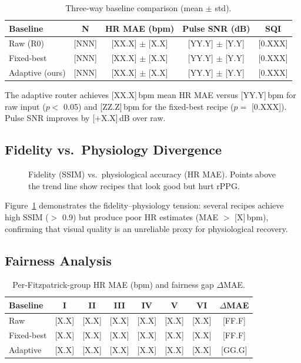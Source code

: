 \documentclass[conference]{IEEEtran}
\begin{document}
\begin{table}[t]
\centering
\caption{Three-way baseline comparison (mean $\pm$ std).}
\label{tab:main_results}
\begin{tabular}{@{}lcccc@{}}
\toprule
Baseline & N & HR MAE (bpm) & Pulse SNR (dB) & SQI \\
\midrule
Raw (R0) & [NNN] & [XX.X] $\pm$ [X.X] & [YY.Y] $\pm$ [Y.Y] & [0.XXX] \\
Fixed-best & [NNN] & [XX.X] $\pm$ [X.X] & [YY.Y] $\pm$ [Y.Y] & [0.XXX] \\
Adaptive (ours) & [NNN] & [XX.X] $\pm$ [X.X] & [YY.Y] $\pm$ [Y.Y] & [0.XXX] \\
\bottomrule
\end{tabular}
\end{table}

The adaptive router achieves [XX.X]\,bpm mean HR MAE versus [YY.Y]\,bpm for raw input ($p <$ 0.05) and [ZZ.Z]\,bpm for the fixed-best recipe ($p =$ [0.XXX]). Pulse SNR improves by [+X.X]\,dB over raw.

\subsection{Fidelity vs.\ Physiology Divergence}
\label{subsec:divergence}

\begin{figure}[t]
\centering
{}
\caption{Fidelity (SSIM) vs.\ physiological accuracy (HR MAE). Points above the trend line show recipes that look good but hurt rPPG.}
\label{fig:divergence}
\end{figure}

Figure~\ref{fig:divergence} demonstrates the fidelity--physiology tension: several recipes achieve high SSIM ($>$ 0.9) but produce poor HR estimates (MAE $>$ [X]\,bpm), confirming that visual quality is an unreliable proxy for physiological recovery.

\subsection{Fairness Analysis}
\label{subsec:fairness}

\begin{table}[t]
\centering
\caption{Per-Fitzpatrick-group HR MAE (bpm) and fairness gap $\Delta$MAE.}
\label{tab:fairness}
\begin{tabular}{@{}lccccccc@{}}
\toprule
Baseline & I & II & III & IV & V & VI & $\Delta$MAE \\
\midrule
Raw & [X.X] & [X.X] & [X.X] & [X.X] & [X.X] & [X.X] & [FF.F] \\
Fixed-best & [X.X] & [X.X] & [X.X] & [X.X] & [X.X] & [X.X] & [FF.F] \\
Adaptive & [X.X] & [X.X] & [X.X] & [X.X] & [X.X] & [X.X] & [GG.G] \\
\bottomrule
\end{tabular}
\end{table}
\end{document}
